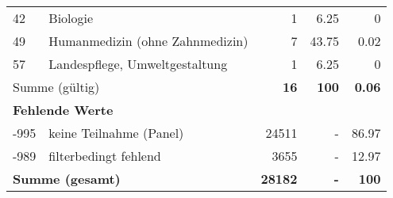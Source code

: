 \begin{longtable}{lXrrr}
     42 &
     \multicolumn{1}{X}{ Biologie   } &


       \num{1} &
       \num[round-mode=places,round-precision=2]{6.25} &
         \num[round-mode=places,round-precision=2]{0} \\

     49 &
     \multicolumn{1}{X}{ Humanmedizin (ohne Zahnmedizin)   } &


       \num{7} &
       \num[round-mode=places,round-precision=2]{43.75} &
         \num[round-mode=places,round-precision=2]{0.02} \\

     57 &
     \multicolumn{1}{X}{ Landespflege, Umweltgestaltung   } &


       \num{1} &
       \num[round-mode=places,round-precision=2]{6.25} &
         \num[round-mode=places,round-precision=2]{0} \\
     \midrule
     \multicolumn{2}{l}{Summe (gültig)} &
       \textbf{\num{16}} &
     \textbf{100} &
       \textbf{\num[round-mode=places,round-precision=2]{0.06}} \\
     \multicolumn{5}{l}{\textbf{Fehlende Werte}}\\
       -995 &
       keine Teilnahme (Panel) &
         \num{24511} &
        - &
         \num[round-mode=places,round-precision=2]{86.97} \\
       -989 &
       filterbedingt fehlend &
         \num{3655} &
        - &
         \num[round-mode=places,round-precision=2]{12.97} \\
     \midrule
     \multicolumn{2}{l}{\textbf{Summe (gesamt)}} &
          \textbf{\num{28182}} &
        \textbf{-} &
        \textbf{100} \\
     \bottomrule
     \end{longtable}
     
